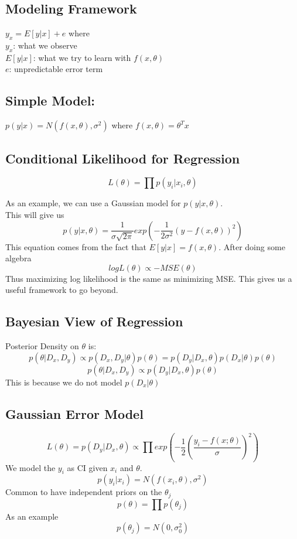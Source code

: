 \documentclass[11pt,psfig]{article}
\begin{document}
\subsection*{Modeling Framework}
$y_x = E[y|x] + e$ where \\
     $y_x$: what we observe\\
     $E[y|x]$: what we try to learn with $f(x,\theta)$\\
     $e$: unpredictable error term

\subsection*{Simple Model:}
     $p(y|x) = N( f(x,\theta), \sigma^2)$ where $f(x,\theta) = \theta^Tx$

\subsection*{Conditional Likelihood for Regression}
\[
L(\theta) = \prod{p(y_i|x_i,\theta)}
\]

As an example, we can use a Gaussian model for $p(y|x,\theta)$.\\
This will give us
\[
p(y|x,\theta) = \frac{1}{\sigma\sqrt{2\pi}} exp(-\frac{1}{2\sigma^2}(y-f(x,\theta))^2)
\]
This equation comes from the fact that $E[y|x] = f(x,\theta)$. 
After doing some algebra
\[
log L(\theta) \propto -MSE(\theta)
\]
Thus maximizing log likelihood is the same as minimizing MSE. This gives us a useful framework to go beyond. 

\subsection*{Bayesian View of Regression}

Posterior Density on $\theta$ is: 
\[
p(\theta|D_x,D_y) \propto p(D_x,D_y|\theta)p(\theta) = p(D_y|D_x,\theta)p(D_x|\theta)p(\theta)
\]
\[
p(\theta|D_x,D_y) \propto p(D_y|D_x,\theta)p(\theta)
\]
This is because we do not model $p(D_x|\theta)$

\subsection*{Gaussian Error Model}

\[
L(\theta) = p(D_y|D_x,\theta) \propto \prod{exp(-\frac{1}{2}(\frac{y_i-f(x;\theta)}{\sigma})^2)}
\]
We model the $y_i$ as CI given $x_i$ and $\theta$. 
\[
p(y_i|x_i) = N( f(x_i,\theta), \sigma^2)
\]
Common to have independent priors on the $\theta_j$
\[
p(\theta) = \prod{p(\theta_j)}
\]
As an example
\[
p(\theta_j) = N(0,\sigma_0^2)
\]
\end{document}
